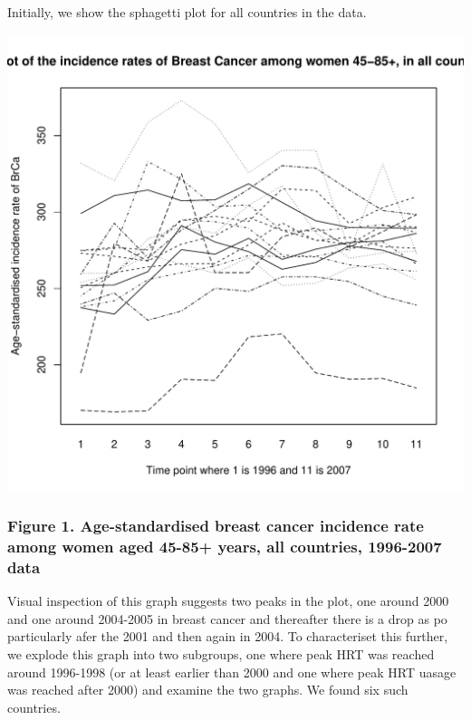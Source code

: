 \documentclass{article}\usepackage[]{graphicx}\usepackage[]{color}
\makeatletter
\def\maxwidth{ %
  \ifdim\Gin@nat@width>\linewidth
    \linewidth
  \else
    \Gin@nat@width
  \fi
}
\newenvironment{knitrout}{}{} %
\makeatother
\begin{document}
Initially, we show the sphagetti plot for all countries in the data.

\begin{knitrout}
\color{fgcolor}
\includegraphics[width=\maxwidth]{figure/sphagettiforall-1} 

\end{knitrout}

\subsubsection*{Figure 1. Age-standardised breast cancer incidence rate among women aged 45-85+ years, all countries, 1996-2007 data}

Visual inspection of this graph suggests two peaks in the plot, one around 2000 and one around 2004-2005 in breast cancer and thereafter there is a drop as po particularly afer the 2001 and then again in 2004. To characteriset this further, we explode this graph into two subgroups, one where peak HRT was reached around 1996-1998 (or at least earlier than 2000 and one where peak HRT uasage was reached after 2000) and examine the two graphs. We found six such countries.
\end{document}
